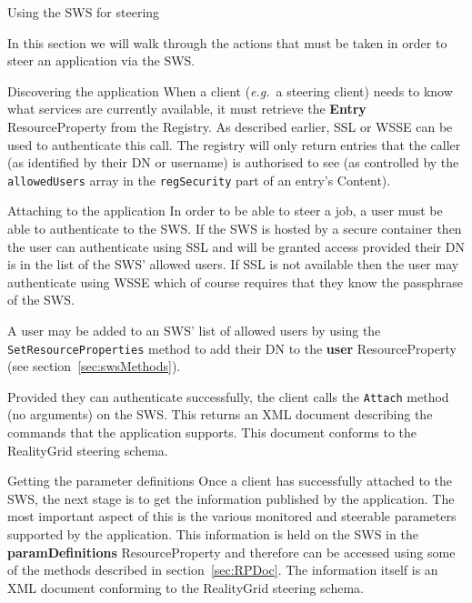 \documentclass[a4paper]{article}
\begin{document}
\begin{section}{Using the SWS for steering}
\label{sec:sws_steering}

In this section we will walk through the actions that must be taken in
order to steer an application via the SWS.

\begin{subsection}{Discovering the application}
When a client ({\it e.g.}\ a steering client) needs to know what
services are currently available, it must retrieve the {\bf Entry}
ResourceProperty from the Registry.  As described earlier, SSL or WSSE
can be used to authenticate this call.  The registry will only return
entries that the caller (as identified by their DN or username) is
authorised to see (as controlled by the \texttt{allowedUsers} array in
the \texttt{regSecurity} part of an entry's Content).
\end{subsection}

\begin{subsection}{Attaching to the application}
In order to be able to steer a job, a user must be able to
authenticate to the SWS.  If the SWS is hosted by a secure container
then the user can authenticate using SSL and will be granted access
provided their DN is in the list of the SWS' allowed users.  If SSL is
not available then the user may authenticate using WSSE which of
course requires that they know the passphrase of the SWS.

A user may be added to an SWS' list of allowed users by using the 
\texttt{SetResourceProperties} method to add their DN to the {\bf user}
ResourceProperty (see section~\ref{sec:swsMethods}).

Provided they can authenticate successfully, the client calls the 
\texttt{Attach} method (no arguments) on the SWS.
This returns an XML document describing the commands that the application
supports.  This document conforms to the RealityGrid steering schema.
\end{subsection}

\begin{subsection}{Getting the parameter definitions}
Once a client has successfully attached to the SWS, the next stage is
to get the information published by the application.  The most
important aspect of this is the various monitored and steerable
parameters supported by the application.  This information is held on
the SWS in the {\bf paramDefinitions} ResourceProperty and therefore
can be accessed using some of the methods described in
section~\ref{sec:RPDoc}.  The information itself is an XML document
conforming to the RealityGrid steering schema.
\end{subsection}


\end{section}
\end{document}
